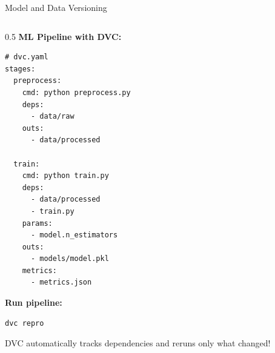 \begin{frame}{Model and Data Versioning}
\begin{columns}
\begin{column}{0.5\textwidth}
\textbf{ML Pipeline with DVC:}

\begin{verbatim}
# dvc.yaml
stages:
  preprocess:
    cmd: python preprocess.py
    deps:
      - data/raw
    outs:
      - data/processed

  train:
    cmd: python train.py
    deps:
      - data/processed
      - train.py
    params:
      - model.n_estimators
    outs:
      - models/model.pkl
    metrics:
      - metrics.json
\end{verbatim}

\vspace{0.2cm}

\textbf{Run pipeline:}
\begin{verbatim}
dvc repro
\end{verbatim}

DVC automatically tracks dependencies and reruns only what changed!
\end{column}
\end{columns}
\end{frame}


